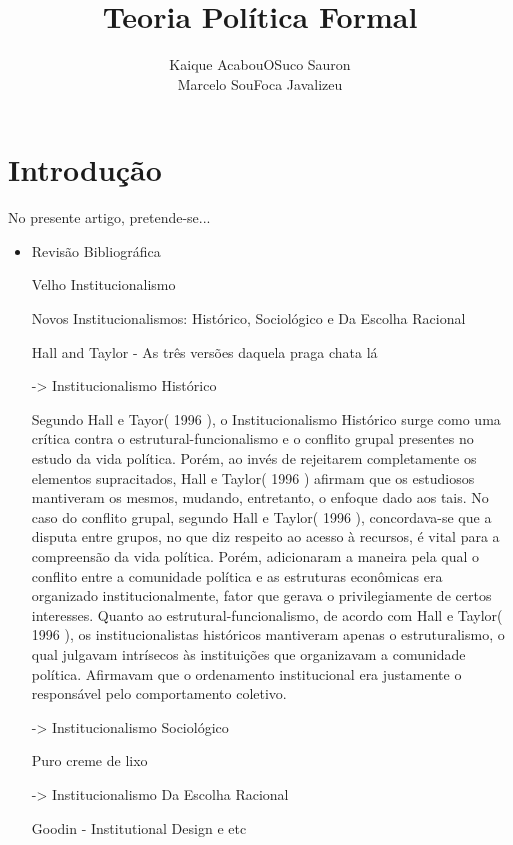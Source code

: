 \documentclass{article}
\title{ Teoria Política Formal}
\author{ Kaique AcabouOSuco Sauron \\ Marcelo SouFoca Javalizeu }
\date{}
\begin{document}
\maketitle

\newpage

\section{ Introdução }

No presente artigo, pretende-se...

\begin{itemize}

\item Revisão Bibliográfica

	\subitem Velho Institucionalismo
    
	\subitem Novos Institucionalismos: Histórico, Sociológico e Da Escolha Racional

		Hall and Taylor - As três versões daquela praga chata lá

			-> Institucionalismo Histórico
			
				Segundo Hall e Tayor( 1996 ), o Institucionalismo Histórico surge como uma crítica contra o estrutural-funcionalismo e o conflito grupal presentes no estudo da vida política. Porém, ao invés de rejeitarem completamente os elementos supracitados, Hall e Taylor( 1996 ) afirmam que os estudiosos mantiveram os mesmos, mudando, entretanto, o enfoque dado aos tais.
				No caso do conflito grupal, segundo Hall e Taylor( 1996 ), concordava-se que a disputa entre grupos, no que diz respeito ao acesso à recursos, é vital para a compreensão da vida política. Porém, adicionaram a maneira pela qual o conflito entre a comunidade política e as estruturas econômicas era organizado institucionalmente, fator que gerava o privilegiamente de certos interesses.
				Quanto ao estrutural-funcionalismo, de acordo com Hall e Taylor( 1996 ), os institucionalistas históricos mantiveram apenas o estruturalismo, o qual julgavam intrísecos às instituições que organizavam a comunidade política. Afirmavam que o ordenamento institucional era justamente o responsável pelo comportamento coletivo.
			
			-> Institucionalismo Sociológico
			
				Puro creme de lixo
			
			-> Institucionalismo Da Escolha Racional
			
			

		Goodin - Institutional Design e etc

			

\end{itemize}
\end{document}

